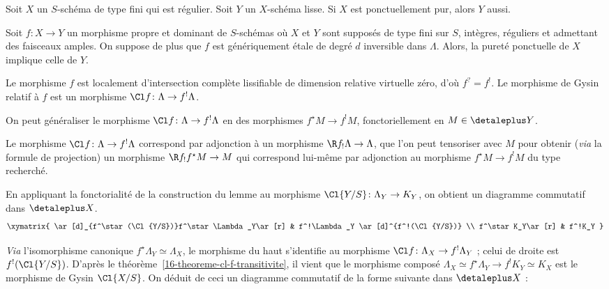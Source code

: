 \documentclass[10pt]{../fichiers-configuration-latex/smfart}
\begin{document}
\begin{corollaire2}\label{16-corollaire-lisse-sur-ponctuellement-pur}
Soit $X$ un $S$-schéma de type fini qui est régulier. Soit $Y$ un
$X$-schéma lisse. Si $X$ est ponctuellement pur, alors $Y$ aussi.
\end{corollaire2}

\begin{proposition2}\label{16-proposition-purete-argument-de-transfert}
Soit $f\colon X\to Y$ un morphisme propre et dominant de $S$-schémas où $X$
et $Y$ sont supposés de type fini sur $S$, intègres, réguliers et
admettant des faisceaux amples.
On suppose de plus que $f$ est génériquement étale de degré $d$ inversible
dans $\Lambda$. Alors, la pureté ponctuelle de $X$ implique celle de $Y$.
\end{proposition2}

Le morphisme $f$ est localement d'intersection complète lissifiable de
dimension relative virtuelle zéro, d'où $f^?=f^!$. Le morphisme de Gysin
relatif à $f$ est un morphisme $\Cl f\colon \Lambda\to f^!\Lambda$.

\begin{lemme2}
On peut généraliser le morphisme $\Cl f\colon \Lambda\to f^!\Lambda$ en des
morphismes $f^\star M\to f^!M$, fonctoriellement en $M\in\detaleplus Y$.
\end{lemme2}

Le morphisme $\Cl f\colon \Lambda\to f^!\Lambda$ correspond par adjonction
à un morphisme $\R f_!\Lambda\to \Lambda$,
que l'on peut tensoriser avec $M$
pour obtenir (\emph{via} la formule de projection) un morphisme
$\R f_!f^\star M\to M$
qui correspond lui-même par adjonction au morphisme
$f^\star M\to f^!M$ du type recherché.

\medskip

En appliquant la fonctorialité de la construction du lemme
au morphisme $\Cl{Y/S}\colon \Lambda_Y
\to K_Y$, on obtient un diagramme commutatif dans $\detaleplus X$.
\[
\xymatrix{
\ar[d]_{f^\star(\Cl {Y/S})}f^\star \Lambda_Y\ar[r] & f^!\Lambda_Y
   \ar[d]^{f^!(\Cl {Y/S})} \\
f^\star K_Y\ar[r] & f^!K_Y }
\]

\emph{Via} l'isomorphisme canonique $f^\star\Lambda_Y\simeq \Lambda_X$, le
morphisme du haut s'identifie au morphisme
$\Cl f\colon\Lambda_X\to f^!\Lambda_Y$ ;
celui de droite est $f^!(\Cl {Y/S})$. D'après le
théorème~\ref{16-theoreme-cl-f-transitivite}, il vient que le morphisme
composé
$\Lambda_X\simeq f^\star \Lambda_Y\to f^!K_Y\simeq K_X$ est le morphisme de
Gysin $\Cl{X/S}$. On déduit de ceci un diagramme commutatif de la forme
suivante dans $\detaleplus X$ :
\end{document}

